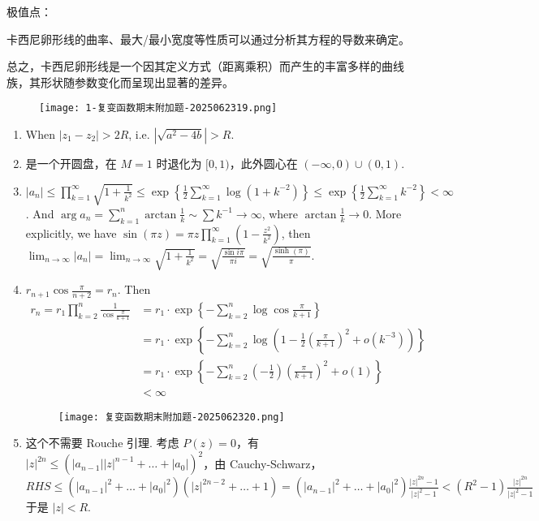 极值点：

卡西尼卵形线的曲率、最大/最小宽度等性质可以通过分析其方程的导数来确定。

总之，卡西尼卵形线是一个因其定义方式（距离乘积）而产生的丰富多样的曲线族，其形状随参数变化而呈现出显著的差异。

\begin{figure}[H]
\centering
\texttt{[image: 1-复变函数期末附加题-2025062319.png]}
\label{}
\end{figure}

\begin{enumerate}
	\item When $\lvert z_1-z_2 \rvert>2R$, i.e. $\left\lvert  \sqrt{ a^{2}-4b }  \right\rvert>R$.
	\item 是一个开圆盘，在 $M=1$ 时退化为 $[0,1)$，此外圆心在 $(-\infty,0)\cup(0,1)$.
	\item $\lvert a_n \rvert\leq \prod_{k=1}^{\infty}\sqrt{ 1+\frac{1}{k^{2}} }\leq \exp \left\{  \frac{1}{2}\sum_{k=1}^{\infty}\log(1+k^{-2})  \right\}\leq \exp \left\{  \frac{1}{2}\sum_{k=1}^{\infty}k^{-2}  \right\}<\infty$. And $\arg a_n=\sum_{k=1}^{n}\arctan\frac{1}{k}\sim \sum k^{-1}\to \infty$, where $\arctan\frac{1}{k}\to 0$. More explicitly, we have $\sin (\pi z)=\pi z\prod_{k=1}^{\infty}\left( 1-\frac{z^{2}}{k^{2}} \right)$, then $\lim_{ n \to \infty }\lvert a_n \rvert=\lim_{ n \to \infty }\sqrt{ 1+\frac{1}{k^{2}} }=\sqrt{ \frac{\sin i\pi}{\pi i} }=\sqrt{ \frac{\sinh(\pi)}{\pi} }$.
	\item $r_{n+1}\cos\frac{\pi}{n+2}=r_n$. Then
\[
\begin{aligned}
r_n=r_1\prod_{k=2}^{n}\frac{1}{\cos \frac{\pi}{k+1}} & =r_1\cdot\exp \left\{  -\sum_{k=2}^{n}\log \cos\frac{\pi}{k+1}  \right\} \\
 & =r_1\cdot \exp \left\{  -\sum_{k=2}^{n}\log\left( 1-\frac{1}{2}\left( \frac{\pi}{k+1} \right)^{2} +o(k^{-3})\right)  \right\} \\
 & =r_1\cdot \exp \left\{  -\sum_{k=2}^{n} \left( -\frac{1}{2} \right)\left( \frac{\pi}{k+1} \right)^{2}+o(1)  \right\} \\
 & < \infty
\end{aligned}
\]
\begin{figure}[H]
\centering
\texttt{[image: 复变函数期末附加题-2025062320.png]}
\label{}
\end{figure}
	\item 这个不需要 Rouche 引理. 考虑 $P(z)=0$，有 $\lvert z \rvert ^{2n}\leq (\lvert a_{n-1} \rvert \lvert z \rvert ^{n-1}+\dots+\lvert a_0 \rvert)^{2}$，由 Cauchy-Schwarz，$RHS\leq \left( \lvert a_{n-1} \rvert ^{2}+\dots+\lvert a_0 \rvert ^{2} \right)(\lvert z \rvert ^{2n-2}+\dots+1)=(\lvert a_{n-1} \rvert ^{2}+\dots+\lvert a_0 \rvert ^{2})\frac{\lvert z \rvert ^{2n}-1}{\lvert z \rvert ^{2}-1}<(R^{2}-1)\frac{\lvert z \rvert ^{2n}}{\lvert z \rvert ^{2}-1}$ 于是 $\lvert z \rvert<R$.

\end{enumerate}
